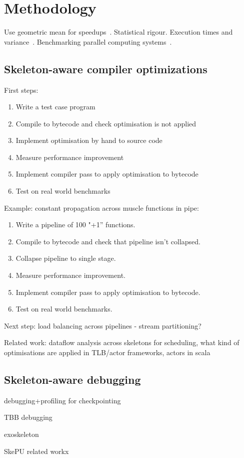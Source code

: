 \section{Methodology}

Use geometric mean for speedups~\cite{Fleming1986}. Statistical
rigour\cite{Georges2007}. Execution times and
variance~\cite{Box}. Benchmarking parallel computing
systems~\cite{Belli2015}.


\subsection{Skeleton-aware compiler optimizations}

First steps:
%
\begin{enumerate}
\item Write a test case program
\item Compile to bytecode and check optimisation is not applied
\item Implement optimisation by hand to source code
\item Measure performance improvement
\item Implement compiler pass to apply optimisation to bytecode
\item Test on real world benchmarks
\end{enumerate}
%
Example: constant propagation across muscle functions in pipe:
%
\begin{enumerate}
\item Write a pipeline of 100 "+1” functions.
\item Compile to bytecode and check that pipeline isn’t collapsed.
\item Collapse pipeline to single stage.
\item Measure performance improvement.
\item Implement compiler pass to apply optimisation to bytecode.
\item Test on real world benchmarks.
\end{enumerate}
%
Next step: load balancing across pipelines - stream partitioning?

Related work: dataflow analysis across skeletons for scheduling, what
kind of optimisations are applied in TLB/actor frameworks, actors in
scala


\subsection{Skeleton-aware debugging}
debugging+profiling for checkpointing

TBB debugging

exoskeleton

SkePU related workx